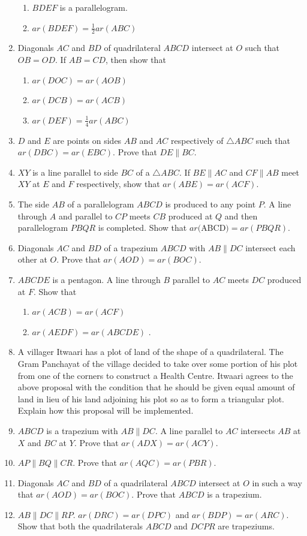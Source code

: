 \begin{enumerate}[label=\arabic*.,ref=\thesubsection.\theenumi]
\begin{enumerate}
\item $BDEF$ is a parallelogram. 
\item $ar (BDEF) =
\frac{1}{ 2}
ar (ABC)$
\end{enumerate}
%
\item   Diagonals $AC$ and $BD$ of quadrilateral $ABCD$ intersect at $O$ such that $OB = OD$. If $AB = CD$, then show that 
\begin{enumerate}
\item $ar (DOC) = ar (AOB)$
 \item $ar (DCB) = ar (ACB)$
\item $ar (DEF) =
\frac{1}{ 4}
ar (ABC)$ 
\end{enumerate}
\item $D$ and $E$ are points on sides $AB$ and $AC$ respectively of $ \triangle  ABC$ such that $ar (DBC) = ar (EBC)$. Prove that $DE  \parallel  BC$.
\item $XY$ is a line parallel to side $BC$ of a $\triangle ABC$. If $BE  \parallel  AC$ and $CF  \parallel  AB$ meet $XY$ at $E$ and $F$ respectively, show that
$ar (ABE) = ar (ACF)$.
\item The side $AB$ of a parallelogram $ABCD$ is produced to any point $P$. A line through $A$ and parallel to $CP$ meets $CB$ produced at $Q$ and then parallelogram $PBQR$ is completed. Show that $ar ($ABCD$) = ar (PBQR)$. \item Diagonals $AC$ and $BD$ of a trapezium $ABCD$ with $AB  \parallel  DC$ intersect each other at $O$. Prove that $ar (AOD) = ar (BOC)$.
\item  $ABCDE$ is a pentagon. A line through $B$ parallel to $AC$ meets $DC$ produced at $F$. Show that 
\begin{enumerate}
\item $ar (ACB) = ar (ACF)$
 \item $ar (AEDF) = ar (ABCDE)$
. 
\end{enumerate}
\item A villager Itwaari has a plot of land of the shape of a quadrilateral. The Gram Panchayat of the village decided to take over some portion of his plot from one of the corners to construct a Health Centre. Itwaari agrees to the above proposal with the condition that he should be given equal amount of land in lieu of his land adjoining his plot so as to form a triangular plot. Explain how this proposal will be implemented.
\item $ABCD$ is a trapezium with $AB  \parallel  DC$. A line parallel to $AC$ intersects $AB$ at $X$ and $BC$ at $Y$. Prove that $ar (ADX) = ar (ACY)$.
\item  $AP  \parallel  BQ  \parallel  CR$. Prove that $ar (AQC) = ar (PBR)$.
\item Diagonals $AC$ and $BD$ of a quadrilateral $ABCD$ intersect at $O$ in such a way that $ar (AOD) = ar (BOC)$. Prove that $ABCD$ is a trapezium.
\item  $AB \parallel DC \parallel RP$.  $ar (DRC) = ar (DPC)$ and $ar (BDP) = ar (ARC)$. Show that both the quadrilaterals $ABCD$ and $DCPR$ are trapeziums.


\end{enumerate}
